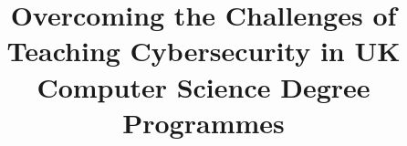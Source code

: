 \documentclass[conference]{IEEEtran}
\begin{document}
\title{Overcoming the Challenges of Teaching Cybersecurity in UK Computer Science Degree Programmes}

\maketitle
\end{document}
